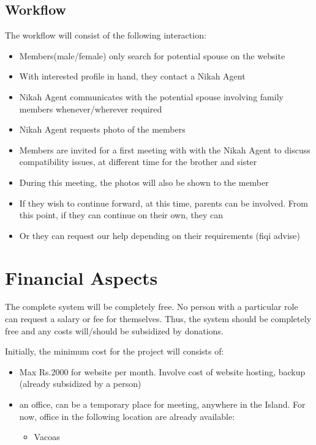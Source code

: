 \documentclass[12pt]{article}
\begin{document}
\subsection{Workflow}\label{sec:Workflow}

The workflow will consist of the following interaction:
\begin{itemize}
	\item Members(male/female) only search for potential spouse on the website
	\item  With interested profile in hand, they contact a  Nikah Agent
	\item  Nikah Agent communicates with the potential spouse involving family members whenever/wherever required
	\item  Nikah Agent requests photo of the members
	\item  Members are invited for a first meeting with with the Nikah Agent to discuss compatibility issues, at different time for the brother and sister
	\item  During this meeting, the photos will also be shown to the member
	\item  If they wish to continue forward, at this time, parents can be involved. From this point, if they can continue on their own, they can 
	\item  Or they can request our help depending on their requirements (fiqi advise)
\end{itemize}

\section{Financial Aspects}\label{sec:financialPart}
The complete system will be completely free. No person with a particular role can request a salary or fee for themselves. Thus, the system should be completely free and any costs will/should be subsidized by donations.

Initially, the minimum cost for the project will consists of:
\begin{itemize}
	\item Max Rs.2000 for website per month. Involve cost of website hosting, backup (already subsidized by a person)
	\item an office, can be a temporary place for meeting, anywhere in the Island. For now, office in the following location are already available:
		\begin{itemize}
			\item Vacoas
		\end{itemize}
\end{itemize}
\end{document}
